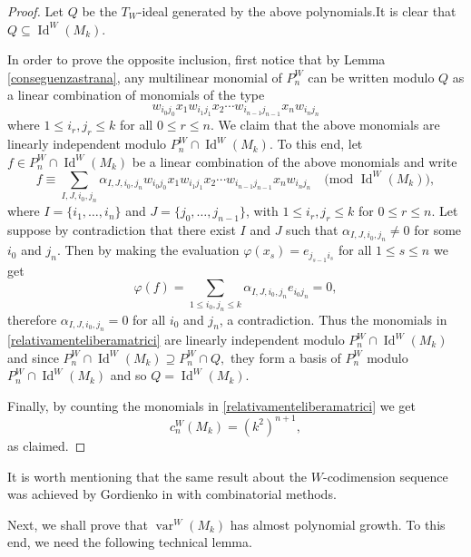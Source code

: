 \documentclass[reqno]{amsart}
\theoremstyle{definition}
\numberwithin{equation}{section}
\numberwithin{theorem}{section}
\DeclareMathOperator{\V}{var}
\DeclareMathOperator{\I}{Id}
\begin{document}
\begin{proof}
    Let $Q$ be the $T_W$-ideal generated by the above polynomials.It is clear that $Q\subseteq \I^W(M_k).$

    In order to prove the opposite inclusion, first notice that by Lemma \ref{conseguenzastrana}, any multilinear monomial of $P_n^W$ can be written modulo $Q$ as a linear combination of monomials of the type
    \begin{equation}\label{relativamenteliberamatrici}
        w_{i_0j_0}x_1w_{i_1j_1}x_2\cdots w_{i_{n-1}j_{n-1}}x_nw_{i_nj_n}
    \end{equation}
    where  $1\leq i_r,j_r\leq k$ for all $0\leq r \leq n$. We claim that the above monomials are linearly independent modulo $P_n^W\cap \I^W(M_k).$ To this end, let $f\in P_n^W\cap \I^W(M_k)$ be a linear combination of the above monomials and write
    $$
    f\equiv  \sum_{I, J, i_0, j_n}\alpha_{I, J, i_0, j_n}w_{i_0j_0}x_1w_{i_1j_1}x_2\cdots w_{i_{n-1}j_{n-1}}x_nw_{i_nj_n} \quad \text{(mod }\I^W(M_k)),
    $$
    where $I=\{i_1,\ldots, i_n\}$ and $J=\{j_0,\ldots, j_{n-1}\}$, with $1\leq i_r,j_r\leq k$ for $0\leq r \leq n$. Let suppose by contradiction that there exist $I$ and $J$ such that $\alpha_{I, J, i_0, j_n}\neq 0$ for some $i_0$ and $j_n.$ Then by making the evaluation $\varphi(x_s)= e_{j_{s-1}i_s}$ for all $1\leq s\leq n$ we get
    $$
    \varphi(f) = \sum_{1\leq i_0,j_n\leq k}\alpha_{I, J, i_0, j_n} e_{i_0j_n}=0,
    $$
    therefore $\alpha_{I, J, i_0, j_n}=0$ for all $i_0$ and $j_n$, a contradiction. Thus the monomials in \eqref{relativamenteliberamatrici} are linearly independent modulo $P_n^W\cap\I^W(M_k)$ and since $P_n^W\cap\I^W(M_k)\supseteq P_n^W\cap Q,$ they form a basis of $P_n^W$ modulo $P_n^W\cap\I^W(M_k)$ and so $Q= \I^W(M_k).$

    Finally, by counting the monomials in \eqref{relativamenteliberamatrici} we get
    $$
    c_n^W(M_k) = (k^2)^{n+1},
    $$
    as claimed.
\end{proof}

It is worth mentioning that the same result about the $W$-codimension sequence was achieved by Gordienko in \cite[Theorem 1]{Gordienko2010} with combinatorial methods.

Next, we shall prove that $\V^W(M_k)$ has almost polynomial growth. To this end, we need the following technical lemma.
\end{document}
